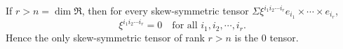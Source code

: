 If $r > n = \dim \Re$, then for every skew-symmetric tensor $\Sigma \xi^{i_1 i_2 \cdots i_r} e_{i_1} \times \cdots \times e_{i_r}$,
$$\xi^{i_1 i_2 \cdots i_r} = 0 \quad \text{for all } i_1, i_2, \cdots, i_r.$$
Hence the only skew-symmetric tensor of rank $r > n$ is the $0$ tensor.
